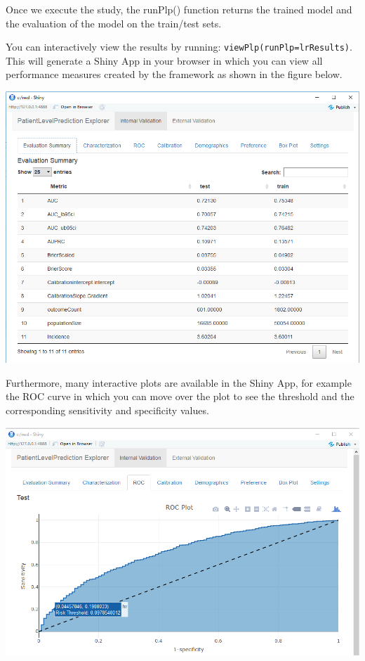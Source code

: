 \documentclass[]{book}
\begin{document}
Once we execute the study, the runPlp() function returns the trained
model and the evaluation of the model on the train/test sets.

You can interactively view the results by running:
\texttt{viewPlp(runPlp=lrResults)}. This will generate a Shiny App in
your browser in which you can view all performance measures created by
the framework as shown in the figure below.

\includegraphics[width=1\linewidth]{images/PatientLevelPrediction/shinysummary}

Furthermore, many interactive plots are available in the Shiny App, for
example the ROC curve in which you can move over the plot to see the
threshold and the corresponding sensitivity and specificity values.

\includegraphics[width=1\linewidth]{images/PatientLevelPrediction/shinyroc}
\end{document}

